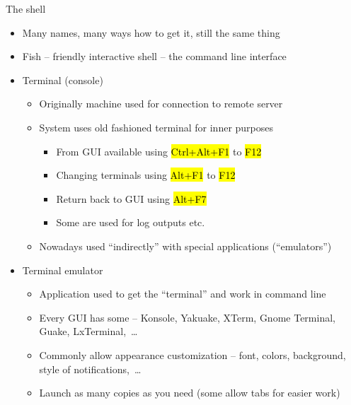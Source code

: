 \documentclass[compress, ucs, xelatex, 11pt, xcolor=svgnames,
  hyperref={
    bookmarks=true,
    unicode=true,
    colorlinks=true,
    pdftitle={Linux, command line and MetaCentrum},
    plainpages=false,
    pdfauthor={Vojtech Zeisek},
    pdfsubject={Course about use of Linux command line, writing shell scripts and using MetaCentrum of CESNET},
    pdfcreator={XeLaTeX},
    pdfkeywords={Linux, GNU, BASH, shell, command line, MetaCentrum},
    linkcolor=DarkRed,
    anchorcolor=DarkBlue,
    citecolor=Indigo,
    filecolor=NavyBlue,
    menucolor=DarkMagenta,
    urlcolor=DarkBlue,
    pdftex},
  url={hyphens, lowtilde} %
  ]{beamer}
\renewcommand{\texttt}[1]{\hl{\ttfamily #1}}
\begin{document}
\begin{frame}{The shell}
\begin{itemize}
  \item Many names, many ways how to get it, still the same thing
  \item Fish -- friendly interactive shell -- the command line interface
  \item Terminal (console)
  \begin{itemize}
    \item Originally machine used for connection to remote server
    \item System uses old fashioned terminal for inner purposes
    \begin{itemize}
      \item From GUI available using \texttt{Ctrl+Alt+F1} to \texttt{F12}
      \item Changing terminals using \texttt{Alt+F1} to \texttt{F12}
      \item Return back to GUI using \texttt{Alt+F7}
      \item Some are used for log outputs etc.
    \end{itemize}
    \item Nowadays used ``indirectly'' with special applications (``emulators'')
  \end{itemize}
  \item Terminal emulator
  \begin{itemize}
    \item Application used to get the ``terminal'' and work in command line
    \item Every GUI has some -- Konsole, Yakuake, XTerm, Gnome Terminal, Guake, LxTerminal,~\ldots
    \item Commonly allow appearance customization -- font, colors, background, style of notifications,~\ldots
    \item Launch as many copies as you need (some allow tabs for easier work)
  \end{itemize}
\end{itemize}
\end{frame}
\end{document}
